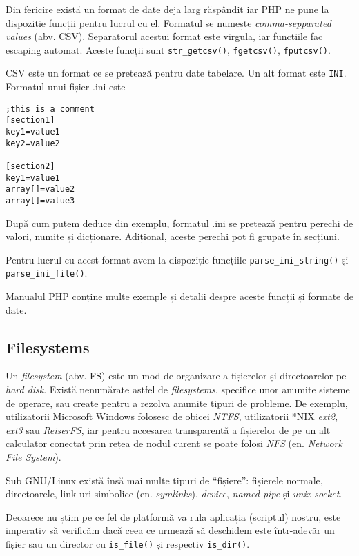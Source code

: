 Din fericire există un format de date deja larg răsp\^andit iar PHP ne
pune la dispoziție funcții pentru lucrul cu el. Formatul se numește
\textsl{comma-sepparated values} (abv. CSV).
Separatorul acestui format este virgula, iar funcțiile fac escaping automat. Aceste funcții sunt
\texttt{str\_getcsv()}, \texttt{fgetcsv()}, \texttt{fputcsv()}.

CSV este un format ce se pretează pentru date tabelare. Un alt format este \texttt{INI}. Formatul
unui fișier .ini este
\begin{verbatim}
;this is a comment
[section1]
key1=value1
key2=value2

[section2]
key1=value1
array[]=value2
array[]=value3
\end{verbatim}

După cum putem deduce din exemplu, formatul .ini se pretează pentru perechi de valori,
numite și dicționare. Adițional, aceste perechi pot fi grupate \^in secțiuni.

Pentru lucrul cu acest format avem la dispoziție funcțiile
\texttt{parse\_ini\_string()} și \texttt{parse\_ini\_file()}.

Manualul PHP conține multe exemple și detalii despre aceste funcții
și formate de date.

\subsection{Filesystems}

Un \textsl{filesystem} (abv. FS) este un mod de organizare a fișierelor
și directoarelor pe \textit{hard disk}. Există nenumărate
astfel de \textit{filesystems}, specifice unor anumite
sisteme de operare, sau create pentru a rezolva anumite tipuri
de probleme. De exemplu, utilizatorii Microsoft Windows folosesc
de obicei \textsl{NTFS}, utilizatorii *NIX \textsl{ext2}, \textsl{ext3}
sau \textsl{ReiserFS}, iar pentru accesarea transparentă a fișierelor
de pe un alt calculator conectat prin rețea de nodul curent se
poate folosi \textsl{NFS} (en. \textsl{Network File System}).

Sub GNU/Linux există însă mai multe tipuri de ``fișiere'':
fișierele normale, directoarele, link-uri simbolice (en. \textsl{symlinks}),
\textsl{device}, \textsl{named pipe} și \textsl{unix socket}.

Deoarece nu știm pe ce fel de platformă va rula aplicația (scriptul)
nostru, este imperativ să verificăm dacă ceea ce urmează să deschidem
este \^intr-adevăr un fișier sau un director cu \texttt{is\_file()}
și respectiv \texttt{is\_dir()}.

